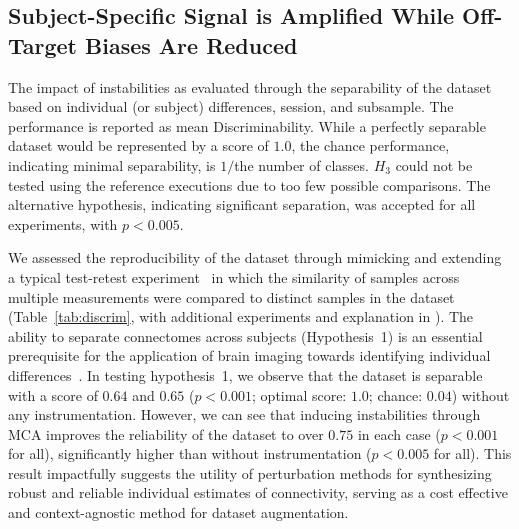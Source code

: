 \documentclass[fleqn,10pt]{SelfArx} %
\begin{document}
\subsection*{Subject-Specific Signal is Amplified While Off-Target Biases Are Reduced}
\begin{table}[ht]\centering
\caption{The impact of instabilities as evaluated through the separability of the dataset based on individual (or
subject) differences, session, and subsample. The performance is reported as mean Discriminability. While a perfectly
separable dataset would be represented by a score of $1.0$, the chance performance, indicating minimal separability, is
$1 /$the number of classes. $H_3$ could not be tested using the reference executions due to too few possible
comparisons. The alternative hypothesis, indicating significant separation, was accepted for all experiments, with
$p < 0.005$.}
\vspace{5pt}

\label{tab:discrim}
\end{table}

We assessed the reproducibility of the dataset through mimicking and extending a typical test-retest
experiment~\cite{bridgeford2020elim} in which the similarity of samples across multiple measurements were
compared to distinct samples in the dataset (Table~\ref{tab:discrim}, with additional experiments and explanation in
). The ability to separate connectomes across subjects (Hypothesis~1) is an essential
prerequisite for the application of brain imaging towards identifying individual differences~\cite{Dubois2016-yr}. In
testing hypothesis~1, we observe that the dataset is separable with a score of $0.64$ and $0.65$ ($p < 0.001$; optimal
score: $1.0$; chance: $0.04$) without any instrumentation. However, we can see that inducing instabilities through MCA
improves the reliability of the dataset to over $0.75$ in each case ($p < 0.001$ for all), significantly higher than
without instrumentation ($p < 0.005$ for all). This result impactfully suggests the utility of perturbation methods for
synthesizing robust and reliable individual estimates of connectivity, serving as a cost effective and context-agnostic
method for dataset augmentation.
\end{document}

